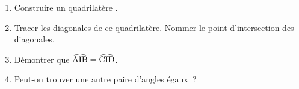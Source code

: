 \documentclass[exercice]{thedocument}%
\begin{document}
%
\begin{enumerate}
    \item Construire un quadrilatère .
    \answerspace{5cm}
    \item Tracer les diagonales de ce quadrilatère. Nommer  le
    point d'intersection des diagonales.\answerspace{}
    \item Démontrer que $\widehat{\text{AIB}}=\widehat{\text{CID}}$.
    \item Peut-on trouver une autre paire d'angles égaux~?
\end{enumerate}
\end{document}

